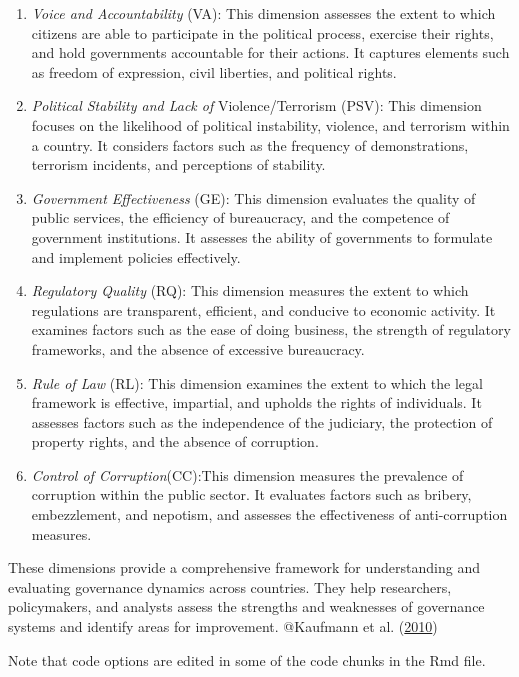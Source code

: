 \documentclass[
  12pt,
]{article}
\begin{document}
\begin{enumerate}
\def\labelenumi{\arabic{enumi}.}
\item
  \emph{Voice and Accountability} (VA): This dimension assesses the extent to
  which citizens are able to participate in the political process,
  exercise their rights, and hold governments accountable for their
  actions. It captures elements such as freedom of expression, civil
  liberties, and political rights.
\item
  \emph{Political Stability and Lack of} Violence/Terrorism (PSV): This
  dimension focuses on the likelihood of political instability,
  violence, and terrorism within a country. It considers factors such
  as the frequency of demonstrations, terrorism incidents, and
  perceptions of stability.
\item
  \emph{Government Effectiveness} (GE): This dimension evaluates the quality
  of public services, the efficiency of bureaucracy, and the
  competence of government institutions. It assesses the ability of
  governments to formulate and implement policies effectively.
\item
  \emph{Regulatory Quality} (RQ): This dimension measures the extent to which
  regulations are transparent, efficient, and conducive to economic
  activity. It examines factors such as the ease of doing business,
  the strength of regulatory frameworks, and the absence of excessive
  bureaucracy.
\item
  \emph{Rule of Law} (RL): This dimension examines the extent to which the
  legal framework is effective, impartial, and upholds the rights of
  individuals. It assesses factors such as the independence of the
  judiciary, the protection of property rights, and the absence of
  corruption.
\item
  \emph{Control of Corruption}(CC):This dimension measures the prevalence of
  corruption within the public sector. It evaluates factors such as
  bribery, embezzlement, and nepotism, and assesses the effectiveness
  of anti-corruption measures.
\end{enumerate}

These dimensions provide a comprehensive framework for understanding and
evaluating governance dynamics across countries. They help researchers,
policymakers, and analysts assess the strengths and weaknesses of
governance systems and identify areas for
improvement. @Kaufmann et al. (\protect\hyperlink{ref-kaufmann2010response}{2010})

Note that code options are edited in some of the code chunks in the Rmd file.
\end{document}
